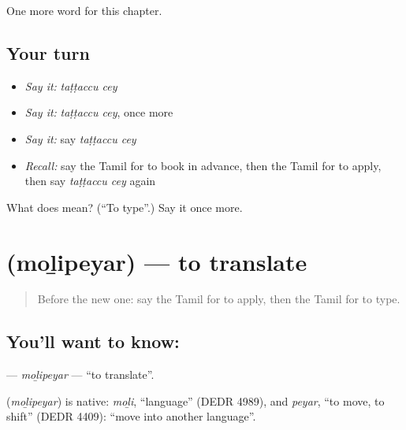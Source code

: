 \begin{grammarlens}[title={What you've built}]
One more word for this chapter.
\end{grammarlens}

\subsection*{Your turn}
\begin{itemize}
\raggedright
  \item \emph{Say it:} \emph{taṭṭaccu cey}
  \item \emph{Say it:} \emph{taṭṭaccu cey}, once more
  \item \emph{Say it:} say \emph{taṭṭaccu cey}
  \item \emph{Recall:} say the Tamil for to book in advance, then the Tamil for to apply, then say \emph{taṭṭaccu cey} again
\end{itemize}

\begin{tcolorbox}[breakable,colback=teal!4,colframe=teal!35!black,title={Before you move on}]
What does   mean? (\textquotedblleft{}To type\textquotedblright{}.) Say it once more.
\end{tcolorbox}
\section[\texorpdfstring{\ta{மொழிபெயர்} (moḻipeyar)}{மொழிபெயர் (moḻipeyar)}]{ (moḻipeyar) — to translate}

\label{lesson:TA-C228-molipeyar}



\begin{quote}
Before the new one: say the Tamil for to apply, then the Tamil for to type.
\end{quote}

\subsection*{You'll want to know: }
\textbf{} — \emph{moḻipeyar} — \textquotedblleft{}to translate\textquotedblright{}.

\begin{cousinweb}
\textbf{} (\emph{moḻipeyar}) is native: \emph{moḻi}, \textquotedblleft{}language\textquotedblright{} (DEDR 4989), and \emph{peyar}, \textquotedblleft{}to move, to shift\textquotedblright{} (DEDR 4409): \textquotedblleft{}move into another language\textquotedblright{}.
\end{cousinweb}

